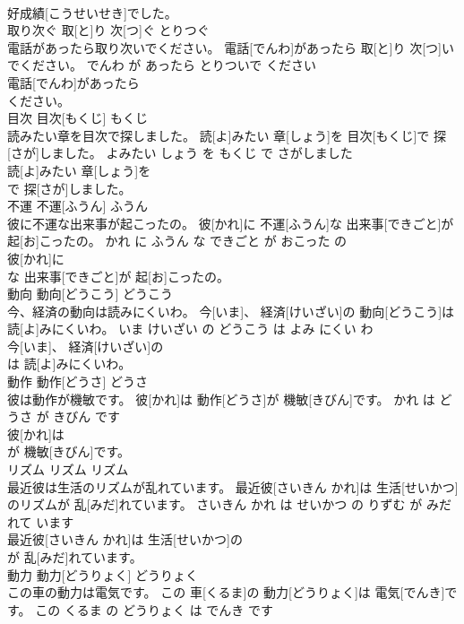 \documentclass[8pt]{extreport}
\begin{document}
\begin{CJK}{UTF8}{min}
\\	好成績[こうせいせき]でした。			
\\	取り次ぐ	取[と]り 次[つ]ぐ	とりつぐ	
\\	電話があったら取り次いでください。	電話[でんわ]があったら 取[と]り 次[つ]いでください。	でんわ が あったら とりついで ください	
\\	電話[でんわ]があったら
\\	ください。			
\\	目次	目次[もくじ]	もくじ	
\\	読みたい章を目次で探しました。	読[よ]みたい 章[しょう]を 目次[もくじ]で 探[さが]しました。	よみたい しょう を もくじ で さがしました	
\\	読[よ]みたい 章[しょう]を
\\	で 探[さが]しました。			
\\	不運	不運[ふうん]	ふうん	
\\	彼に不運な出来事が起こったの。	彼[かれ]に 不運[ふうん]な 出来事[できごと]が 起[お]こったの。	かれ に ふうん な できごと が おこった の	
\\	彼[かれ]に
\\	な 出来事[できごと]が 起[お]こったの。			
\\	動向	動向[どうこう]	どうこう	
\\	今、経済の動向は読みにくいわ。	今[いま]、 経済[けいざい]の 動向[どうこう]は 読[よ]みにくいわ。	いま けいざい の どうこう は よみ にくい わ	
\\	今[いま]、 経済[けいざい]の
\\	は 読[よ]みにくいわ。			
\\	動作	動作[どうさ]	どうさ	
\\	彼は動作が機敏です。	彼[かれ]は 動作[どうさ]が 機敏[きびん]です。	かれ は どうさ が きびん です	
\\	彼[かれ]は
\\	が 機敏[きびん]です。			
\\	リズム	リズム	リズム	
\\	最近彼は生活のリズムが乱れています。	最近彼[さいきん かれ]は 生活[せいかつ]のリズムが 乱[みだ]れています。	さいきん かれ は せいかつ の りずむ が みだれて います	
\\	最近彼[さいきん かれ]は 生活[せいかつ]の
\\	が 乱[みだ]れています。			
\\	動力	動力[どうりょく]	どうりょく	
\\	この車の動力は電気です。	この 車[くるま]の 動力[どうりょく]は 電気[でんき]です。	この くるま の どうりょく は でんき です	

\end{CJK}
\end{document}
